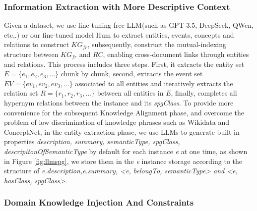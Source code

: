 \documentclass{article}
\begin{document}
\subsubsection{Information Extraction with More Descriptive Context}
Given a dataset, we use fine-tuning-free LLM(such as GPT-3.5, DeepSeek, QWen, etc,.) or our fine-tuned model Hum to extract entities, events, concepts and relations to construct $KG_{fr}$, subsequently, construct the mutual-indexing structure between $KG_{fr}$ and $RC$, enabling cross-document links through entities and relations. This process includes three steps. First, it extracts the entity set $E = \{e_1, e_2, e_3, ...\}$ chunk by chunk, second, extracts the event set ${EV} = \{{ev}_1, {ev}_2, {ev}_3, ...\}$ associated to all entities and iteratively extracts the relation set $R = \{r_1, r_2, r_3, ...\}$ between all entities in $E$, finally, completes all hypernym relations between the instance and its \textit{spgClass}. To provide more convenience for the subsequent Knowledge Alignment phase, and overcome the problem of low discrimination of knowledge phrases such as Wikidata\cite{vrandevcic2014wikidata} and ConceptNet\cite{liu2004conceptnet}, in the entity extraction phase, we use LLMs to generate built-in properties \textit{description, summary, semanticType, spgClass, descripitonOfSemanticType} by default for each instance \textit{e} at one time, as shown in Figure \ref{fig:llmspg}, we store them in the \textit{e} instance storage according to the structure of \textit{e.description,e.summary, <e, belongTo, semanticType> and <e, hasClass, spgClass>}. 
\subsubsection{Domain Knowledge Injection And Constraints}
\end{document}
